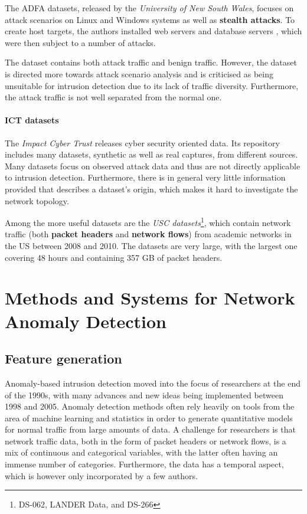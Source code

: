 \documentclass[a4paper,12pt,twoside]{report}
\begin{document}
The ADFA datasets, released by the \textit{University of New South Wales}, focuses on attack scenarios on Linux and Windows systems as well as \textbf{stealth attacks}. To create host targets, the authors  installed web servers and database servers , which were then subject to a number of attacks. 

The dataset contains both attack traffic and benign traffic. However, the dataset is directed more towards attack scenario analysis and is criticised as being unsuitable for intrusion detection due to its lack of traffic diversity. Furthermore, the attack traffic is not well separated from the normal one.

\subsubsection*{ICT datasets \cite{USC2010ICT}}

The \textit{Impact Cyber Trust} releases cyber security oriented data. Its repository includes many datasets, synthetic as well as real captures, from different sources. Many datasets focus on observed attack data and thus are not directly applicable to intrusion detection. Furthermore, there is in general very little information provided that describes a dataset's origin, which makes it hard to investigate the network topology.

Among the more useful datasets are the \textit{USC datasets}\footnote{DS-062, LANDER Data, and DS-266}, which contain network traffic (both \textbf{packet headers} and \textbf{network flows}) from academic networks in the US between 2008 and 2010. The datasets are very large, with the largest one covering 48 hours and containing 357 GB of packet headers. 


\chapter{Methods and Systems for Network Anomaly Detection}\label{Anomaly detection}

\section{Feature generation}

Anomaly-based intrusion detection moved into the focus of researchers at the end of the 1990s, with many advances and new ideas being implemented between 1998 and 2005. Anomaly detection methods often rely heavily on tools from the area of machine learning and statistics in order to generate quantitative models for normal traffic from large amounts of data. A challenge for researchers is that network traffic data, both in the form of packet headers or network flows, is a mix of continuous and categorical variables, with the latter often having an immense number of categories. Furthermore, the data has a temporal aspect, which is however only incorporated by a few authors. 
\end{document}
